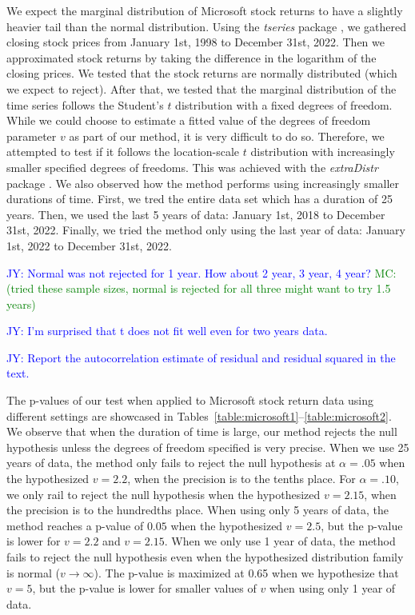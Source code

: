 \documentclass[12pt, titlepage, letterpaper]{article}
\newcommand{\jy}[1]{\textcolor{blue}{JY: #1}}
\newcommand{\mc}[1]{\textcolor{green}{MC: (#1)}}
\begin{document}
{We expect the marginal distribution of Microsoft stock returns to have a 
slightly
heavier tail than the normal distribution. Using the \textsl{tseries} package 
\citep{tseries}, 
we gathered closing stock prices from January 1st, 1998 to December 31st, 2022.
Then we approximated stock returns by taking the difference in the logarithm 
of the closing prices.
We tested that the stock returns are normally
distributed (which we expect to reject).  After that, we tested that the
marginal distribution of the time series follows the Student's $t$ distribution
with a fixed degrees of freedom.
While we 
could choose to estimate a fitted value of the degrees of freedom parameter $v$
as
part of our method, it is very difficult to do so. Therefore, we attempted to
test 
if it follows
the location-scale $t$ distribution with increasingly smaller specified degrees 
of freedoms. This was achieved with the \textsl{extraDistr} 
package \citep{extraDistr}. We
also observed how the method performs using increasingly smaller durations of
time. First, we tred the entire data set which has a duration of 25 years. Then,
we used the last 5 years of data: January 1st, 2018 to December 31st, 2022.
Finally, we tried the method only using the last year of data: January 1st, 2022
to December 31st, 2022.












\jy{Normal was not rejected for 1 year. How about 2 year, 3 year, 4 year?}
\mc{tried these sample sizes, normal is rejected for all three might want to
  try 1.5 years}

\jy{I'm surprised that t does not fit well even for two years data.}

\jy{Report the autocorrelation estimate of residual and residual squared in the
  text.}



The p-values of our test when applied to Microsoft stock return data using
different settings are showcased in 
Tables~\ref{table:microsoft1}--\ref{table:microsoft2}.
We observe that when the duration of time is large, our method rejects the null
hypothesis unless the degrees of freedom specified is very precise. When
we use 25 years of data, the method
only fails to reject the null hypothesis at $\alpha = .05$ when 
the hypothesized $v = 2.2$, when 
the precision
is to the tenths place. For $\alpha = .10$, we only rail to reject the null 
hypothesis when the hypothesized $v = 2.15$, when the precision is to the 
hundredths place.
When using only 5 years of data, the method reaches a p-value of 
$0.05$ when the hypothesized $v = 2.5$, but the p-value is
lower for $v = 2.2$ and $v = 2.15$.
When we only use 1 year of data, the method fails to reject the null hypothesis
even when the hypothesized distribution family is normal ($v \to \infty$). The
p-value is maximized at 0.65 when we hypothesize that $v = 5$, but the p-value 
is lower for smaller values of $v$ when using only 1 year of data.


}
\end{document}
